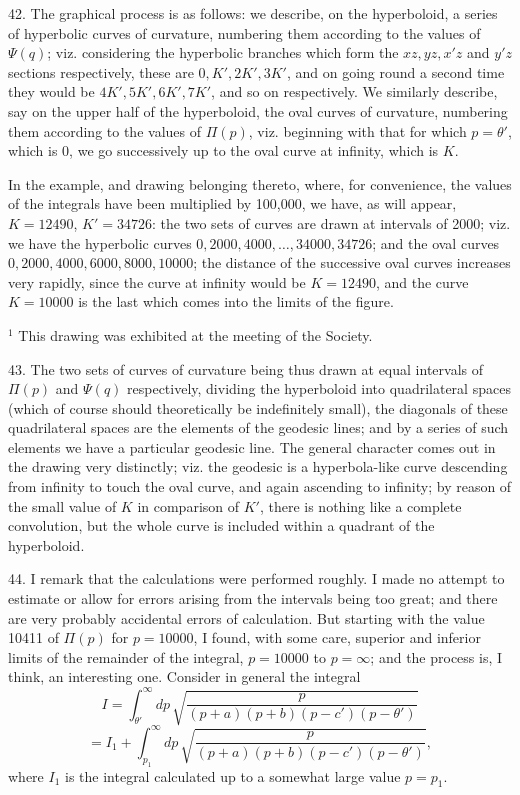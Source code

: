 \documentclass[11pt,a4paper]{article}
\begin{document}
42. The graphical process is as follows: we describe, on the hyperboloid, a series of
hyperbolic curves of curvature, numbering them according to the values of $\Psi(q)$; viz.
considering the hyperbolic branches which form the $xz,yz,x'z$ and $y'z$ sections
respectively, these are $0,K',2K',3K'$, and on going round a second time they would be
$4K',5K',6K',7K'$, and so on respectively. We similarly describe, say on the upper half of
the hyperboloid, the oval curves of curvature, numbering them according to the values of
$\Pi(p)$, viz. beginning with that for which $p=\theta'$, which is 0, we go successively up
to the oval curve at infinity, which is $K$.

In the example, and drawing belonging thereto, where, for convenience, the values of the
integrals have been multiplied by 100,000, we have, as will appear,
$K=12490$, $K'=34726$: the two sets of curves are drawn at intervals of 2000; viz. we have
the hyperbolic curves $0,2000,4000,\ldots,34000,34726$; and the oval curves $0,2000,4000,
6000,8000,10000$; the distance of the successive oval curves increases very rapidly, since
the curve at infinity would be $K=12490$, and the curve $K=10000$ is the last which comes
into the limits of the figure.

\begin{center}
{\footnotesize $^1$ This drawing was exhibited at the meeting of the Society.}
\end{center}

43. The two sets of curves of curvature being thus drawn at equal intervals of $\Pi(p)$
and $\Psi(q)$ respectively, dividing the hyperboloid into quadrilateral spaces (which of
course should theoretically be indefinitely small), the diagonals of these quadrilateral
spaces are the elements of the geodesic lines; and by a series of such elements we have a
particular geodesic line. The general character comes out in the drawing very distinctly;
viz. the geodesic is a hyperbola-like curve descending from infinity to touch the oval curve,
and again ascending to infinity; by reason of the small value of $K$ in comparison of $K'$,
there is nothing like a complete convolution, but the whole curve is included within a
quadrant of the hyperboloid.

44. I remark that the calculations were performed roughly. I made no attempt to estimate or
allow for errors arising from the intervals being too great; and there are very probably
accidental errors of calculation. But starting with the value 10411 of $\Pi(p)$ for
$p=10000$, I found, with some care, superior and inferior limits of the remainder of the
integral, $p=10000$ to $p=\infty$; and the process is, I think, an interesting one. Consider
in general the integral
\[
 I=\int_{\theta'}^\infty dp\,
 \sqrt{\frac{p}{(p+a)(p+b)(p-c')(p-\theta')}}
\]
\[
 =I_1+\int_{p_1}^\infty dp\,
 \sqrt{\frac{p}{(p+a)(p+b)(p-c')(p-\theta')}},
\]
where $I_1$ is the integral calculated up to a somewhat large value $p=p_1$.
\end{document}
